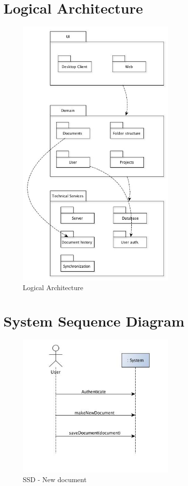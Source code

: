 \documentclass[11pt,a4paper]{article}
\begin{document}
\section{Logical Architecture}
	\begin{figure}[H]
  		\centering
    	\includegraphics[width=300px]{images/LogicalArchitecture.jpg}
    	\caption{Logical Architecture}
	\end{figure}

\section{System Sequence Diagram}
	\begin{figure}[H]
  		\centering
    	\includegraphics[width=300px]{images/SSQ_NewDocument.jpg}
    	\caption{SSD - New document}
	\end{figure}
	
\end{document}
